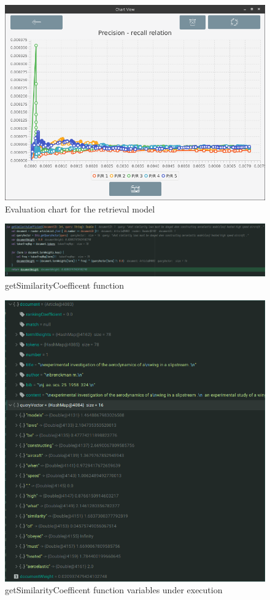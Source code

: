 \documentclass{article}
\begin{document}
\begin{figure}[h]
	\caption{Evaluation chart for the retrieval model}
	\centering
	\includegraphics[scale=0.5]{modelEvaluation}
\end{figure}

\begin{figure}[h]
	\caption{getSimilarityCoefficent function}
	\centering
	\includegraphics[scale=0.4]{documentWeightsFunction}
\end{figure}

\begin{figure}[h]
	\caption{getSimilarityCoefficent function variables under execution}
	\centering
	\includegraphics[scale=0.4]{documentWeights}
\end{figure}

\end{document}
